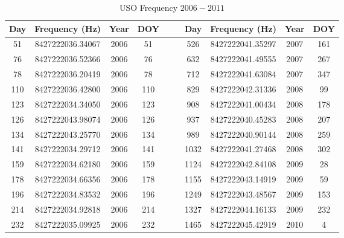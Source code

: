 \documentclass{article}
\begin{document}
                \begin{table}[H]
                    \centering
                    \captionsetup{type=table}
                    \caption{USO Frequency $2006-2011$}
                    \label{tab:usr_uso_freq_vals}
                    \begin{tabular}{|ccccc|ccccc|}
                        \hline
                        Day&Frequency (Hz)&Year&DOY
                            &&&Day&Frequency (Hz)&Year&DOY\\
                        \hline
                        51&8427222036.34067&2006&51
                            &&&526&8427222041.35297&2007&161\\
                        76&8427222036.52366&2006&76
                            &&&632 &8427222041.49555&2007&267\\
                        78&8427222036.20419&2006&78
                            &&&712 &8427222041.63084&2007&347\\
                        110&8427222036.42800&2006&110
                            &&&829 &8427222042.31336&2008&99 \\
                        123&8427222034.34050&2006&123
                            &&&908 &8427222041.00434&2008&178\\
                        126&8427222043.98074&2006&126
                            &&&937 &8427222040.45283&2008&207\\
                        134&8427222043.25770&2006&134
                            &&&989 &8427222040.90144&2008&259\\
                        141&8427222034.29712&2006&141
                            &&&1032&8427222041.27468&2008&302\\
                        159&8427222034.62180&2006&159
                            &&&1124&8427222042.84108&2009& 28\\
                        178&8427222034.66356&2006&178
                            &&&1155&8427222043.14919&2009& 59\\
                        196&8427222034.83532&2006&196
                            &&&1249&8427222043.48567&2009&153\\
                        214&8427222034.92818&2006&214
                            &&&1327&8427222044.16133&2009&232\\
                        232&8427222035.09925&2006&232
                            &&&1465&8427222045.42919&2010&  4\\

\end{tabular}
\end{table}
\end{document}
